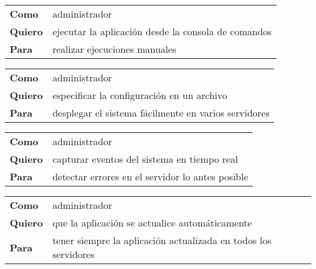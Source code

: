         \begin{tabular}{ll}
            \textbf{Como}   & administrador                                                         \\
            
            \textbf{Quiero} & ejecutar la aplicación desde la consola de comandos                   \\
            
            \textbf{Para}   & realizar ejecuciones manuales                                         \\
        \end{tabular}
        
        \begin{tabular}{ll}
            \textbf{Como}   & administrador                                                         \\
            
            \textbf{Quiero} & especificar la configuración en un archivo                            \\
            
            \textbf{Para}   & desplegar el sistema fácilmente en varios servidores                  \\
        \end{tabular}
        
        \begin{tabular}{ll}
            \textbf{Como}   & administrador                                                         \\
            
            \textbf{Quiero} & capturar eventos del sistema en tiempo real                           \\
            
            \textbf{Para}   & detectar errores en el servidor lo antes posible                      \\
        \end{tabular}
        
        \begin{tabular}{ll}
            \textbf{Como}   & administrador                                                         \\
            
            \textbf{Quiero} & que la aplicación se actualice automáticamente                        \\
            
            \textbf{Para}   & tener siempre la aplicación actualizada en todos los servidores       \\
        \end{tabular}
        

